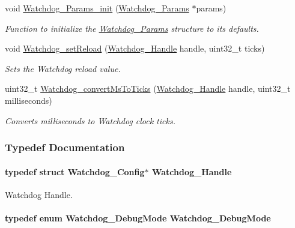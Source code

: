 \begin{DoxyCompactItemize}
void \hyperlink{_watchdog_8h_a6a6f54cfdac33d3bf33464a212262afc}{Watchdog\+\_\+\+Params\+\_\+init} (\hyperlink{struct_watchdog___params}{Watchdog\+\_\+\+Params} $\ast$params)
\begin{DoxyCompactList}\small\item\em Function to initialize the \hyperlink{struct_watchdog___params}{Watchdog\+\_\+\+Params} structure to its defaults. \end{DoxyCompactList}\item 
void \hyperlink{_watchdog_8h_a476ef7b9d4e7268717adf94d8505f4a5}{Watchdog\+\_\+set\+Reload} (\hyperlink{_watchdog_8h_a00ed22749c947ef200434eeec507f90d}{Watchdog\+\_\+\+Handle} handle, uint32\+\_\+t ticks)
\begin{DoxyCompactList}\small\item\em Sets the Watchdog reload value. \end{DoxyCompactList}\item 
uint32\+\_\+t \hyperlink{_watchdog_8h_a7b93cd0bd3a6f11aa28b0c7219755979}{Watchdog\+\_\+convert\+Ms\+To\+Ticks} (\hyperlink{_watchdog_8h_a00ed22749c947ef200434eeec507f90d}{Watchdog\+\_\+\+Handle} handle, uint32\+\_\+t milliseconds)
\begin{DoxyCompactList}\small\item\em Converts milliseconds to Watchdog clock ticks. \end{DoxyCompactList}\end{DoxyCompactItemize}


\subsubsection{Typedef Documentation}
\paragraph[{Watchdog\+\_\+\+Handle}]{\setlength{\rightskip}{0pt plus 5cm}typedef struct {\bf Watchdog\+\_\+\+Config}$\ast$ {\bf Watchdog\+\_\+\+Handle}}\label{_watchdog_8h_a00ed22749c947ef200434eeec507f90d}


Watchdog Handle. 

\paragraph[{Watchdog\+\_\+\+Debug\+Mode}]{\setlength{\rightskip}{0pt plus 5cm}typedef enum {\bf Watchdog\+\_\+\+Debug\+Mode}  {\bf Watchdog\+\_\+\+Debug\+Mode}}\label{_watchdog_8h_a369f0c40c3acb08f0ad21df99aedd42f}


